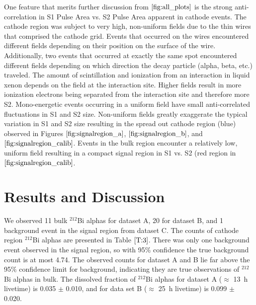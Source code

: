 One feature that merits further discussion from $\ref{fig:all_plots}$ is the strong anti-correlation in S1 Pulse Area vs. S2 Pulse Area apparent in cathode events. The cathode region was subject to very high, non-uniform fields due to the thin wires that comprised the cathode grid. Events that occurred on the wires encountered different fields depending on their position on the surface of the wire. Additionally, two events that occurred at exactly the same spot encountered different fields depending on which direction the decay particle (alpha, beta, etc.) traveled. The amount of scintillation and ionization from an interaction in liquid xenon depends on the field at the interaction site. Higher fields result in more ionization electrons being separated from the interaction site and therefore more S2. Mono-energetic events occurring in a uniform field have small anti-correlated fluctuations in S1 and S2 size. Non-uniform fields greatly exaggerate the typical variation in S1 and S2 size resulting in the spread out cathode region (blue) observed in Figures $\ref{fig:signalregion_a}$, $\ref{fig:signalregion_b}$, and $\ref{fig:signalregion_calib}$. Events in the bulk region encounter a relatively low, uniform field resulting in a compact signal region in S1 vs. S2 (red region in $\ref{fig:signalregion_calib}$. 


\section{Results and Discussion}
\label{results}
We observed 11 bulk $^{212}$Bi alphas for dataset A, 20 for dataset B, and 1 background event in the signal region from dataset C. The counts of cathode region $^{212}$Bi alphas are presented in Table $\ref{T:3}$. There was only one background event observed in the signal region, so with 95\% confidence the true background count is at most 4.74. The observed counts for dataset A and B lie far above the 95\% confidence limit for background, indicating they are true observations of  $^{212}$Bi alphas in bulk. The dissolved fraction of $^{212}$Bi alphas for dataset A ($\approx$ 13~h livetime) is 0.035 $\pm$ 0.010, and for data set B ($\approx$ 25~h livetime) is 0.099 $\pm$ 0.020. 

